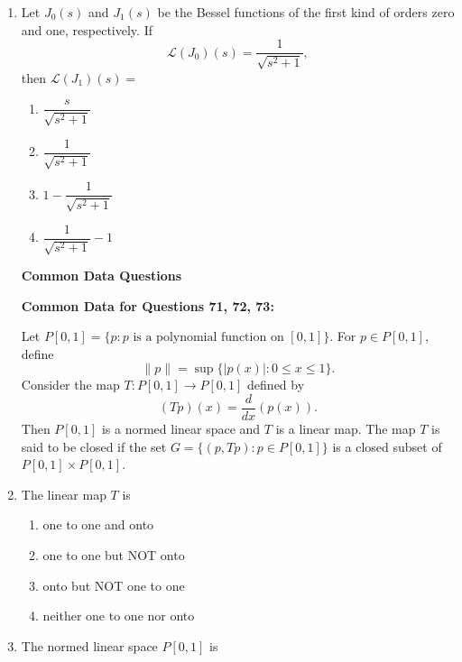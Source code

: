 \documentclass[journal]{IEEEtran}
\numberwithin{equation}{enumi}
\numberwithin{figure}{enumi}
\begin{document}
\begin{enumerate}
\item Let $J_0(s)$ and $J_1(s)$ be the Bessel functions of the first kind of orders zero and one, respectively. If
\[
\mathcal{L}(J_0)(s) = \frac{1}{\sqrt{s^2 + 1}},
\]
then $\mathcal{L}(J_1)(s) =$
\hfill{}
\begin{multicols}{2}
    \begin{enumerate}
        \item $\dfrac{s}{\sqrt{s^2 + 1}}$
        \item $\dfrac{1}{\sqrt{s^2 + 1}}$
        \item $1 - \dfrac{1}{\sqrt{s^2 + 1}}$
        \item $\dfrac{1}{\sqrt{s^2 + 1}} - 1$
    \end{enumerate}
    \end{multicols}
 
\bigskip

\begin{center}
    \textbf{Common Data Questions}
\end{center}

\textbf{Common Data for Questions 71, 72, 73:}

Let $P[0,1] = \{p : p \text{ is a polynomial function on } [0,1]\}$. For $p \in P[0,1]$, define
\[
\|p\| = \sup \{|p(x)| : 0 \leq x \leq 1\}.
\]
Consider the map $T : P[0,1] \rightarrow P[0,1]$ defined by
\[
(Tp)(x) = \frac{d}{dx} \left(p(x)\right).
\]
Then $P[0,1]$ is a normed linear space and $T$ is a linear map. The map $T$ is said to be closed if the set $G = \{(p, Tp) : p \in P[0,1]\}$ is a closed subset of $P[0,1] \times P[0,1]$.

\vspace{1em}

\item The linear map $T$ is
\hfill{}
\begin{multicols}{2}
    \begin{enumerate}
        \item one to one and onto
        \item one to one but NOT onto
        \item onto but NOT one to one
        \item neither one to one nor onto
    \end{enumerate}
    \end{multicols}




\item The normed linear space $P[0,1]$ is
\hfill{}


\end{enumerate}
\end{document}
